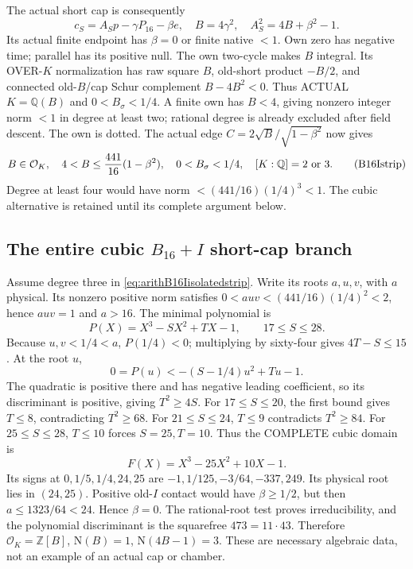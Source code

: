 \documentclass[11pt]{article}
\begin{document}
The actual short cap is consequently
\[
 c_S=A_Sp-\gamma P_{16}-\beta e,\quad
 B=4\gamma^2,\quad A_S^2=4B+\beta^2-1 .
\]
Its actual finite endpoint has
\(\beta=0\) or finite native \(<1\).
Own zero has negative time; parallel
has its positive null.
The own two-cycle makes \(B\) integral.
Its OVER-\(K\) normalization has raw
square \(B\), old-short product \(-B/2\),
and connected old-\(B\)/cap Schur
complement \(B-4B^2<0\).
Thus ACTUAL \(K=\mathbb Q(B)\) and
\(0<B_\sigma<1/4\).
A finite own has \(B<4\), giving
nonzero integer norm \(<1\) in degree
at least two; rational degree is already
excluded after field descent.
The own is dotted.
The actual edge
\(C=2\sqrt B/\sqrt{1-\beta^2}\) now gives
\[
 B\in\mathcal O_K,\quad4<B\le{\frac{441}{16}}(1-\beta^2),\quad
 0<B_\sigma<1/4,\quad [K:\mathbb Q]=2\ \hbox{or }3 .
\tag{B16Istrip}\label{eq:arithB16Iisolatedstrip}
\]
Degree at least four would have norm
\(<(441/16)(1/4)^3<1\).
The cubic alternative is retained until
its complete argument below.

\subsection[The entire cubic B16+I short-cap branch]{The entire cubic \(B_{16}+I\) short-cap branch}
\label{app:arithB16Icubic}

Assume degree three in
\eqref{eq:arithB16Iisolatedstrip}.
Write its roots \(a,u,v\), with \(a\)
physical.
Its nonzero positive norm satisfies
\(0<auv<(441/16)(1/4)^2<2\), hence
\(auv=1\) and \(a>16\).
The minimal polynomial is
\[
                    P(X)=X^3-SX^2+TX-1,\qquad17\le S\le28 .
\]
Because \(u,v<1/4<a\), \(P(1/4)<0\);
multiplying by sixty-four gives
\(4T-S\le15\).
At the root \(u\),
\[
                  0=P(u)<-(S-1/4)u^2+Tu-1 .
\]
The quadratic is positive there and has
negative leading coefficient, so its
discriminant is positive, giving \(T^2\ge4S\).
For \(17\le S\le20\), the first bound
gives \(T\le8\), contradicting \(T^2\ge68\).
For \(21\le S\le24\), \(T\le9\)
contradicts \(T^2\ge84\).
For \(25\le S\le28\), \(T\le10\)
forces \(S=25,T=10\).
Thus the COMPLETE cubic domain is
\[
                         F(X)=X^3-25X^2+10X-1 .
\]
Its signs at \(0,1/5,1/4,24,25\) are
\(-1,1/125,-3/64,-337,249\).
Its physical root lies in \((24,25)\).
Positive old-\(I\) contact would have
\(\beta\ge1/2\), but then
\(a\le1323/64<24\).
Hence \(\beta=0\).
The rational-root test proves irreducibility,
and the polynomial discriminant is the
squarefree \(473=11\cdot43\).
Therefore \(\mathcal O_K=\mathbb Z[B]\),
\(\mathrm N(B)=1\), \(\mathrm N(4B-1)=3\).
These are necessary algebraic data, not
an example of an actual cap or chamber.
\end{document}
